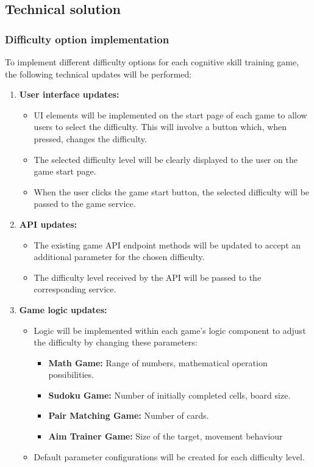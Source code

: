 \documentclass[11pt,a4paper]{article}
\begin{document}
\subsection{Technical solution}
\subsubsection{Difficulty option implementation}
To implement different difficulty options for each cognitive skill training game, the following technical updates will be performed:

\begin{enumerate}
    \item \textbf{User interface updates:}
    \begin{itemize}
        \item UI elements will be implemented on the start page of each game to allow users to select the difficulty. This will involve a button which, when pressed, changes the difficulty.
    	\item The selected difficulty level will be clearly displayed to the user on the game start page.
    	\item When the user clicks the game start button, the selected difficulty will be passed to the game service.
    \end{itemize}
    \item \textbf{API updates:}
    \begin{itemize}
        \item The existing game API endpoint methods will be updated to accept an additional parameter for the chosen difficulty.
    	\item The difficulty level received by the API will be passed to the corresponding service.
    \end{itemize}
    \item \textbf{Game logic updates:}
    \begin{itemize}
        \item Logic will be implemented within each game's logic component to adjust the difficulty by changing these parameters:
    			\begin{itemize}
    				\item \textbf{Math Game:} Range of numbers, mathematical operation possibilities.
    				\item \textbf{Sudoku Game:} Number of initially completed cells, board size.
    				\item \textbf{Pair Matching Game:} Number of cards.
    				\item \textbf{Aim Trainer Game:} Size of the target, movement behaviour
    			\end{itemize}
    		\item Default parameter configurations will be created for each difficulty level.
    	 

\end{itemize}
\end{enumerate}
\end{document}
